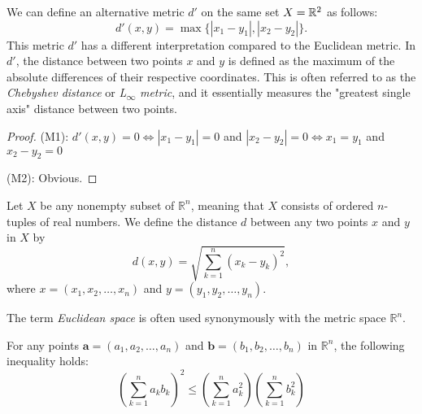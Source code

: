 \begin{example}
    We can define an alternative metric \( d' \) on the same set \( X = \mathbb R^2 \) as follows:
    \[
    d'(x, y) = \max\{|x_1 - y_1|, |x_2 - y_2|\}.
    \]
    This metric \( d' \) has a different interpretation compared to the Euclidean metric. In \( d' \), the distance between two points \( x \) and \( y \) is defined as the maximum of the absolute differences of their respective coordinates. This is often referred to as the \textit{Chebyshev distance} or \textit{L\textsubscript{$\infty$} metric}, and it essentially measures the "greatest single axis" distance between two points.

\end{example}
\begin{proof}
    \item (M1): $d'(x,y) = 0 \iff |x_{1} - y_{1}| =0$ and $|x_{2} - y_{2}| =0 \iff x_1 = y_1$ and $x_2 - y_2 = 0$ 
    \item (M2): Obvious.
    \item 
\end{proof}
\begin{example}
    Let \(X\) be any nonempty subset of \(\mathbb{R}^n\), meaning that \(X\) consists of ordered \(n\)-tuples of real numbers. We define the distance \(d\) between any two points \(x\) and \(y\) in \(X\) by
    \[
    d(x, y) = \sqrt{\sum_{k=1}^{n} (x_k - y_k)^2},
    \]
    where \(x = (x_1, x_2, \ldots, x_n)\) and \(y = (y_1, y_2, \ldots, y_n)\).
\end{example}
The term \textit{Euclidean space} is often used synonymously with the metric space \(\mathbb{R}^n\).
\begin{theorem}
    For any points \( \mathbf{a} = (a_1, a_2, \ldots, a_n) \) and \( \mathbf{b} = (b_1, b_2, \ldots, b_n) \) in \( \mathbb{R}^n \), the following inequality holds:
    \[
    \left( \sum_{k=1}^{n} a_k b_k \right)^2 \leq \left( \sum_{k=1}^{n} a_k^2 \right) \left( \sum_{k=1}^{n} b_k^2 \right) 
    \]
\end{theorem}
